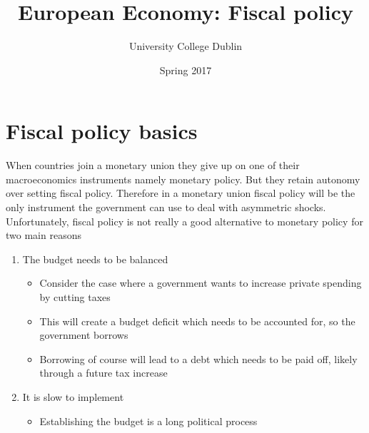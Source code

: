 \documentclass{tufte-handout}
\title{European Economy: Fiscal policy}
\author{University College Dublin}
\date{Spring 2017}
\begin{document}
\maketitle  
\section{Fiscal policy basics}
When countries join a monetary union they give up on one of their macroeconomics instruments namely monetary policy. 
But they retain autonomy over setting fiscal policy. 
Therefore in a monetary union fiscal policy will be the only instrument the government can use to deal with asymmetric shocks.
Unfortunately, fiscal policy is not really a good alternative to monetary policy for two main reasons
\begin{enumerate}
  \item The budget needs to be balanced
  \begin{itemize}
    \item Consider the case where a government wants to increase private spending by cutting taxes
    \item This will create a budget deficit which needs to be accounted for, so the government borrows
    \item Borrowing of course will lead to a debt which needs to be paid off, likely through a future tax increase
  \end{itemize}
  \item It is slow to implement
  \begin{itemize}
    \item Establishing the budget is a long political process
  \end{itemize}
\end{enumerate}
\end{document}
